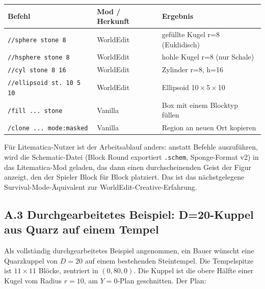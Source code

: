 \documentclass[12pt,a4paper]{scrartcl}
\newcommand{\code}[1]{\texttt{\small #1}}
\newcommand{\cmd}[1]{\textcolor{earth}{\texttt{\small #1}}}
\begin{document}
\vspace{0.4em}
\begin{center}
\small
\begin{tabularx}{\textwidth}{@{}llX@{}}
\toprule
\textbf{Befehl} & \textbf{Mod / Herkunft} & \textbf{Ergebnis} \\
\midrule
\cmd{//sphere stone 8}     & WorldEdit & gefüllte Kugel r=8 (Euklidisch)  \\
\cmd{//hsphere stone 8}    & WorldEdit & hohle Kugel r=8 (nur Schale)  \\
\cmd{//cyl stone 8 16}     & WorldEdit & Zylinder r=8, h=16  \\
\cmd{//ellipsoid st. 10 5 10} & WorldEdit & Ellipsoid 10\,$\times$\,5\,$\times$\,10  \\
\cmd{/fill ... stone}      & Vanilla & Box mit einem Blocktyp füllen  \\
\cmd{/clone ... mode:masked} & Vanilla & Region an neuen Ort kopieren  \\
\bottomrule
\end{tabularx}
\end{center}

Für Litematica-Nutzer ist der Arbeitsablauf anders: anstatt Befehle auszuführen, wird die Schematic-Datei (Block Round exportiert \code{.schem}, Sponge-Format v2) in das Litematica-Mod geladen, das dann einen durchscheinenden Geist der Figur anzeigt, den der Spieler Block für Block platziert. Das ist das nächstgelegene Survival-Mode-Äquivalent zur WorldEdit-Creative-Erfahrung.

\subsection*{A.3 Durchgearbeitetes Beispiel: D=20-Kuppel aus Quarz auf einem Tempel}
Als vollständig durchgearbeitetes Beispiel angenommen, ein Bauer wünscht eine Quarzkuppel von $D=20$ auf einem bestehenden Steintempel. Die Tempelspitze ist $11 \times 11$ Blöcke, zentriert in $(0,80,0)$. Die Kuppel ist die obere Hälfte einer Kugel vom Radius $r=10$, am $Y=0$-Plan geschnitten. Der Plan:
\end{document}
